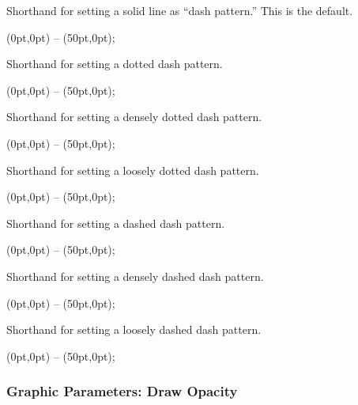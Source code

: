 \begin{itemize}
  Shorthand for setting a solid line as ``dash pattern.'' This is the default.

\begin{codeexample}[]
\tikz \draw[solid] (0pt,0pt) -- (50pt,0pt);
\end{codeexample}

  Shorthand for setting a dotted dash pattern.

\begin{codeexample}[]
\tikz \draw[dotted] (0pt,0pt) -- (50pt,0pt);
\end{codeexample}

  Shorthand for setting a densely dotted dash pattern.

\begin{codeexample}[]
\tikz {} (0pt,0pt) -- (50pt,0pt);
\end{codeexample}

  Shorthand for setting a loosely dotted dash pattern.

\begin{codeexample}[]
\tikz {} (0pt,0pt) -- (50pt,0pt);
\end{codeexample}

  Shorthand for setting a dashed dash pattern.

\begin{codeexample}[]
\tikz \draw[dashed] (0pt,0pt) -- (50pt,0pt);
\end{codeexample}

  Shorthand for setting a densely dashed dash pattern.

\begin{codeexample}[]
\tikz {} (0pt,0pt) -- (50pt,0pt);
\end{codeexample}

  Shorthand for setting a loosely dashed dash pattern.

\begin{codeexample}[]
\tikz {} (0pt,0pt) -- (50pt,0pt);
\end{codeexample}
\end{itemize}


\subsubsection{Graphic Parameters: Draw Opacity}

